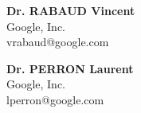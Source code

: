 \textbf{Dr. RABAUD Vincent}\\
Google, Inc. \\
vrabaud@google.com

\textbf{Dr. PERRON Laurent}\\
Google, Inc. \\
lperron@google.com
